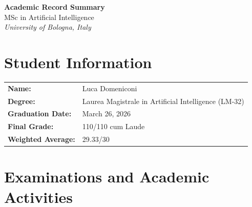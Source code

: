 \documentclass[10pt,a4paper]{article}
\begin{document}
\begin{center}
    {\huge \textbf{Academic Record Summary}}\\[2mm]
    {\large MSc in Artificial Intelligence}\\
    \textit{University of Bologna, Italy}
\end{center}

\vspace{8mm}

\section*{Student Information}

\begin{tabular}{>{\bfseries}p{4cm} p{10cm}}
Name: & Luca Domeniconi \\
Degree: & Laurea Magistrale in Artificial Intelligence (LM-32) \\
Graduation Date: & March 26, 2026 \\
Final Grade: & 110/110 cum Laude \\
Weighted Average: & 29.33/30 \\
\end{tabular}

\vspace{8mm}

\section*{Examinations and Academic Activities}
\end{document}

